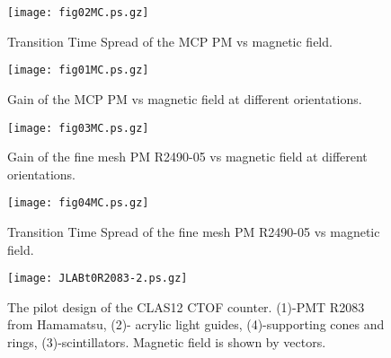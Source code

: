 \begin{figure}[htbp]%
\begin{center}
\texttt{[image: fig02MC.ps.gz]}
\end{center}
\caption{%
Transition Time Spread of the MCP PM  vs magnetic field.
\label{mcpt}}
\end{figure}
\clearpage

\begin{figure}[htbp]%
\begin{center}
\texttt{[image: fig01MC.ps.gz]}
\end{center}
\caption{%
Gain of the MCP PM  vs magnetic field at different orientations. 
\label{mcpg}}
\end{figure}
\clearpage



\begin{figure}[htbp]%
\begin{center}
\texttt{[image: fig03MC.ps.gz]}
\end{center}
\caption{%
Gain of the fine mesh PM R2490-05 vs magnetic field at different orientations. 
\label{fmg}}
\end{figure}
\clearpage


\begin{figure}[htbp]%
\begin{center}
\texttt{[image: fig04MC.ps.gz]}
\end{center}
\caption{%
Transition Time Spread of the fine mesh PM R2490-05 vs magnetic field.
\label{fmt}}
\end{figure}
\clearpage


\begin{figure}[htbp]%
\begin{center}
\texttt{[image: JLABt0R2083-2.ps.gz]}
\end{center}
\caption{%
The pilot design  of the CLAS12 CTOF counter.
 (1)-PMT R2083 from Hamamatsu, (2)- acrylic light guides,
(4)-supporting cones and rings, (3)-scintillators.
Magnetic field is shown by vectors.
\label{bentlg03}}
\end{figure}
\clearpage


